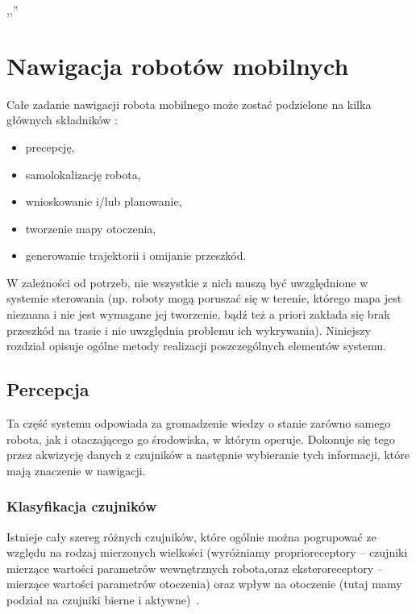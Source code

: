 

\begin{savequote}[70mm]
,,''
\qauthor{}
\end{savequote}

\chapter{Nawigacja robotów mobilnych}
\label{chap:nawigacja}

Całe zadanie nawigacji robota mobilnego może zostać podzielone na kilka głównych
składników \cite[cz.~9]{szynkiewiczWR}:

\begin{itemize}
  \item precepcję,
  \item samolokalizację robota,
  \item wnioskowanie i/lub planowanie,
  \item tworzenie mapy otoczenia,
  \item generowanie trajektorii i omijanie przeszkód.
\end{itemize}

W zależności od potrzeb, nie wszystkie z nich muszą być uwzględnione w systemie
sterowania (np. roboty mogą poruszać się w terenie, którego mapa jest nieznana
i nie jest wymagane jej tworzenie, bądź też a priori zakłada się brak
przeszkód na trasie i nie uwzględnia problemu ich wykrywania). Niniejszy
rozdział opisuje ogólne metody realizacji poszczególnych elementów systemu.

\section{Percepcja}

Ta część systemu odpowiada za gromadzenie wiedzy o stanie zarówno samego robota,
jak i otaczającego go środowiska, w którym operuje. Dokonuje się tego przez
akwizycję danych z czujników a następnie wybieranie tych informacji, które mają
znaczenie w nawigacji. 

\subsection{Klasyfikacja czujników}

Istnieje cały szereg różnych
czujników, które ogólnie można pogrupować ze względu na rodzaj mierzonych
wielkości (wyróżniamy proprioreceptory -- czujniki mierzące wartości parametrów
wewnętrznych robota,oraz eksteroreceptory -- mierzące wartości parametrów
otoczenia) oraz wpływ na otoczenie (tutaj mamy podział na czujniki bierne i
aktywne)~\cite{siegwart}.


